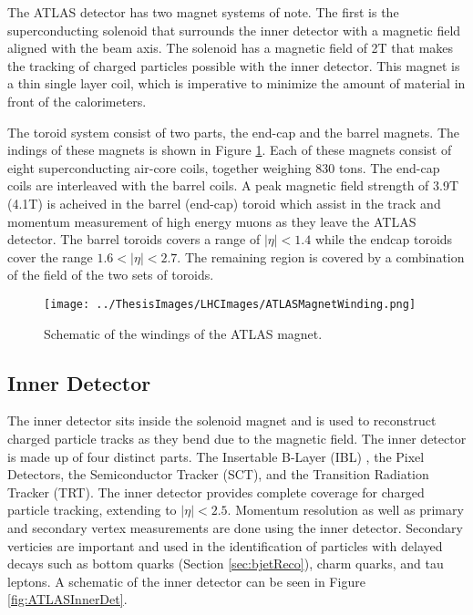 The ATLAS detector has two magnet systems of note.  The first is the superconducting solenoid that surrounds the inner detector with a magnetic field aligned with the beam axis.  The solenoid has a magnetic field of 2T that makes the tracking of charged particles possible with the inner detector.  This magnet is a thin single layer coil, which is imperative to minimize the amount of material in front of the calorimeters. 

The toroid system consist of two parts, the end-cap and the barrel magnets.  The indings of these magnets is shown in Figure \ref{fig:ATLASMagnetWinding}.  Each of these magnets consist of eight superconducting air-core coils, together weighing 830 tons.  The end-cap coils are interleaved with the barrel coils.  A peak magnetic field strength of 3.9T (4.1T) is acheived in the barrel (end-cap) toroid which assist in the track and momentum measurement of high energy muons as they leave the ATLAS detector.  The barrel toroids covers a range of $|\eta|<1.4$ while the endcap toroids cover the range $1.6 < |\eta| <2.7$.  The remaining region is covered by a combination of the field of the two sets of toroids.
\begin{figure}[h!]
	\centering
	\texttt{[image: ../ThesisImages/LHCImages/ATLASMagnetWinding.png]}
	\caption[Schematic of the windings of the ATLAS magnet.]{Schematic of the windings of the ATLAS magnet.\cite{ATLAS}
	}
	\label{fig:ATLASMagnetWinding}
\end{figure}

\subsection{Inner Detector}
\label{sec:InnerDet}
The inner detector sits inside the solenoid magnet and is used to reconstruct charged particle tracks as they bend due to the magnetic field.  The inner detector is made up of four distinct parts.  The Insertable B-Layer (IBL) \cite{Capeans:1291633}, the Pixel Detectors, the Semiconductor Tracker (SCT), and the Transition Radiation Tracker (TRT)\cite{CERN-LHCC-97-016}.  The inner detector provides complete coverage for charged particle tracking, extending to $|\eta|<2.5$.  Momentum resolution as well as primary and secondary vertex measurements are done using the inner detector.  Secondary verticies are important and used in the identification of particles with delayed decays such as bottom quarks (Section \ref{sec:bjetReco}), charm quarks, and tau leptons. A schematic of the inner detector can be seen in Figure \ref{fig:ATLASInnerDet}.

